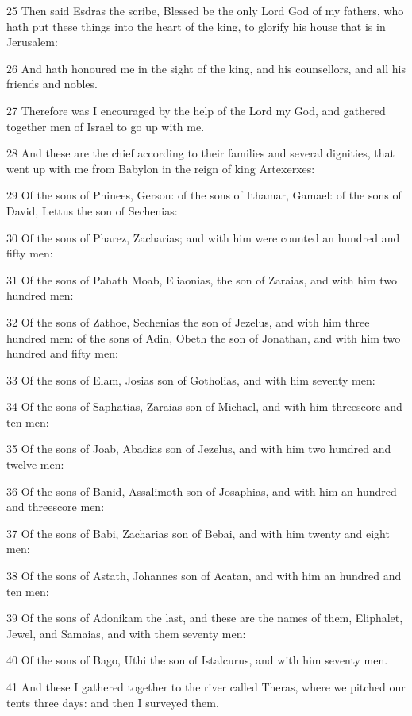 \par 25 Then said Esdras the scribe, Blessed be the only Lord God of my fathers, who hath put these things into the heart of the king, to glorify his house that is in Jerusalem:
\par 26 And hath honoured me in the sight of the king, and his counsellors, and all his friends and nobles.
\par 27 Therefore was I encouraged by the help of the Lord my God, and gathered together men of Israel to go up with me.
\par 28 And these are the chief according to their families and several dignities, that went up with me from Babylon in the reign of king Artexerxes:
\par 29 Of the sons of Phinees, Gerson: of the sons of Ithamar, Gamael: of the sons of David, Lettus the son of Sechenias:
\par 30 Of the sons of Pharez, Zacharias; and with him were counted an hundred and fifty men:
\par 31 Of the sons of Pahath Moab, Eliaonias, the son of Zaraias, and with him two hundred men:
\par 32 Of the sons of Zathoe, Sechenias the son of Jezelus, and with him three hundred men: of the sons of Adin, Obeth the son of Jonathan, and with him two hundred and fifty men:
\par 33 Of the sons of Elam, Josias son of Gotholias, and with him seventy men:
\par 34 Of the sons of Saphatias, Zaraias son of Michael, and with him threescore and ten men:
\par 35 Of the sons of Joab, Abadias son of Jezelus, and with him two hundred and twelve men:
\par 36 Of the sons of Banid, Assalimoth son of Josaphias, and with him an hundred and threescore men:
\par 37 Of the sons of Babi, Zacharias son of Bebai, and with him twenty and eight men:
\par 38 Of the sons of Astath, Johannes son of Acatan, and with him an hundred and ten men:
\par 39 Of the sons of Adonikam the last, and these are the names of them, Eliphalet, Jewel, and Samaias, and with them seventy men:
\par 40 Of the sons of Bago, Uthi the son of Istalcurus, and with him seventy men.
\par 41 And these I gathered together to the river called Theras, where we pitched our tents three days: and then I surveyed them.
